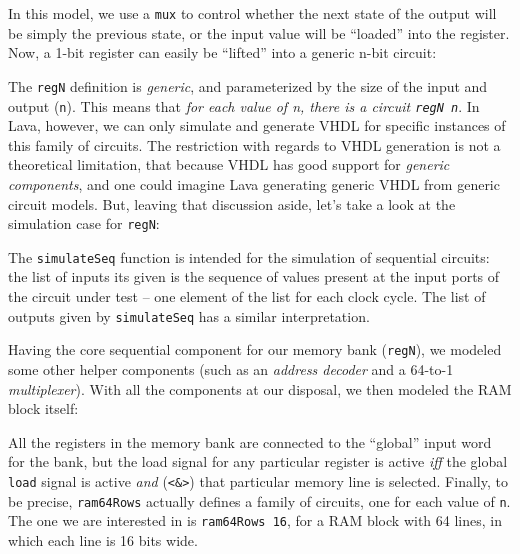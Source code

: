 \documentclass[a4paper]{article}
\begin{document}

                In this model, we use a \texttt{mux} to control whether the next state of the output
                will be simply the previous state, or the input value will be ``loaded'' into the
                register. Now, a 1-bit register can easily be ``lifted'' into a generic n-bit
                circuit:


                The \texttt{regN} definition is \emph{generic}, and parameterized by the size of the
                input and output (\texttt{n}). This means that \emph{for each value of n, there is a
                    circuit \texttt{regN n}}. In Lava, however, we can only simulate and generate
                VHDL for specific instances of this family of circuits. The restriction with regards
                to VHDL generation is not a theoretical limitation, that because VHDL has good
                support for \emph{generic components}, and one could imagine Lava generating generic
                VHDL from generic circuit models. But, leaving that discussion aside, let's take a
                look at the simulation case for \texttt{regN}:


                The \texttt{simulateSeq} function is intended for the simulation of sequential
                circuits: the list of inputs its given is the sequence of values present at the
                input ports of the circuit under test -- one element of the list for each clock
                cycle. The list of outputs given by \texttt{simulateSeq} has a similar
                interpretation.

                Having the core sequential component for our memory bank (\texttt{regN}), we modeled
                some other helper components (such as an \emph{address decoder} and a 64-to-1
                \emph{multiplexer}). With all the components at our disposal, we then modeled the
                RAM block itself:


                All the registers in the memory bank are connected to the ``global'' input word for
                the bank, but the load signal for any particular register is active \emph{iff} the
                global \texttt{load} signal is active \emph{and} (\texttt{<\&>}) that particular
                memory line is selected. Finally, to be precise, \texttt{ram64Rows} actually defines
                a family of circuits, one for each value of \texttt{n}. The one we are interested in
                is \texttt{ram64Rows 16}, for a RAM block with 64 lines, in which each line is 16
                bits wide.
\end{document}
